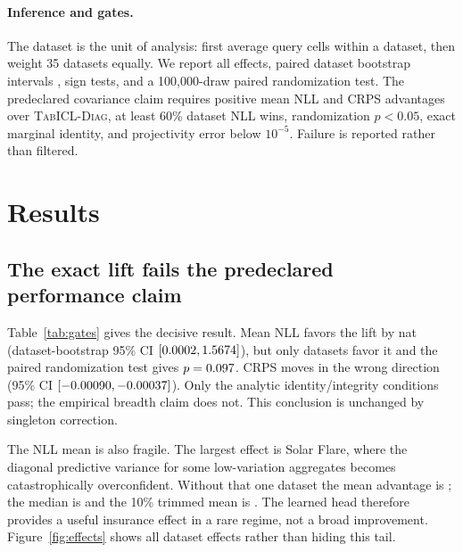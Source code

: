 \documentclass{article}
\newcommand{\method}{\textsc{ProjTabICL}}
\newcommand{\diagbase}{\textsc{TabICL-Diag}}
\begin{document}
\paragraph{Inference and gates.}
The dataset is the unit of analysis: first average query cells within a
dataset, then weight 35 datasets equally.  We report all effects, paired
dataset bootstrap intervals \citep{efron1994bootstrap}, sign tests, and a
100,000-draw paired randomization test.  The predeclared covariance claim
requires positive mean NLL and CRPS advantages over \diagbase{}, at least
60\% dataset NLL wins, randomization $p<0.05$, exact marginal identity, and
projectivity error below $10^{-5}$.  Failure is reported rather than filtered.

\section{Results}\label{sec:results}

\subsection{The exact lift fails the predeclared performance claim}

\begin{table}[t]
\caption{Predeclared comparison against identical TabICLv2 diagonal
marginals.  Positive score differences favor \method{}.  Inference is over
35 dataset means, not thousands of correlated query cells.}
\label{tab:gates}
\centering

\end{table}

Table~\ref{tab:gates} gives the decisive result.  Mean NLL favors the lift by
\NLLAdv{} nat (dataset-bootstrap 95\% CI $[0.0002,1.5674]$), but only
\NLLWins{} datasets favor it and the paired randomization test gives
$p=0.097$.  CRPS moves in the wrong direction (95\% CI
$[-0.00090,-0.00037]$).
Only the analytic identity/integrity conditions pass; the empirical breadth
claim does not.  This conclusion is unchanged by singleton correction.

The NLL mean is also fragile.  The largest effect is Solar Flare, where the
diagonal predictive variance for some low-variation aggregates becomes
catastrophically overconfident.  Without that one dataset the mean advantage
is \OutlierRemovedAdv{}; the median is \MedianAdv{} and the 10\% trimmed mean
is \TrimmedAdv{}.  The learned head therefore provides a useful insurance
effect in a rare regime, not a broad improvement.  Figure~\ref{fig:effects}
shows all dataset effects rather than hiding this tail.
\end{document}
